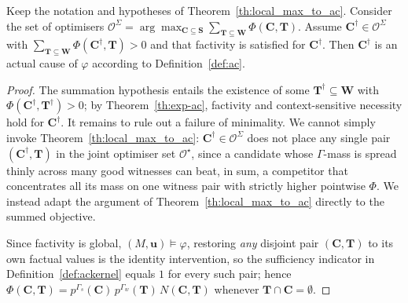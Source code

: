 \begin{corollary}\label{cor:marginalize}
Keep the notation and hypotheses of Theorem~\ref{th:local_max_to_ac}. Consider the set
of optimisers
$\mathcal{O}^\Sigma = \arg\max_{\mathbf{C}\subseteq\mathbf{S}}
\sum_{\mathbf{T}\subseteq\mathbf{W}} \Phi(\mathbf{C},\mathbf{T})$. Assume
$\mathbf{C}^\dagger\in\mathcal{O}^\Sigma$ with
$\sum_{\mathbf{T}\subseteq\mathbf{W}} \Phi(\mathbf{C}^\dagger,\mathbf{T})>0$ and that
factivity is satisfied for $\mathbf{C}^\dagger$. Then $\mathbf{C}^\dagger$ is an actual
cause of $\varphi$ according to Definition~\ref{def:ac}.
\end{corollary}

\begin{proof}
The summation hypothesis entails the existence of some
$\mathbf{T}^\dagger\subseteq\mathbf{W}$ with $\Phi(\mathbf{C}^\dagger,\mathbf{T}^\dagger)>0$;
by Theorem~\ref{th:exp-ac}, factivity and context-sensitive necessity hold for
$\mathbf{C}^\dagger$. It remains to rule out a failure of minimality. We cannot simply
invoke Theorem~\ref{th:local_max_to_ac}: $\mathbf{C}^\dagger\in\mathcal{O}^\Sigma$ does
not place any single pair $(\mathbf{C}^\dagger,\mathbf{T})$ in the joint optimiser set
$\mathcal{O}^\star$, since a candidate whose $\Gamma$-mass is spread thinly across many
good witnesses can beat, in sum, a competitor that concentrates all its mass on one
witness pair with strictly higher pointwise $\Phi$. We instead adapt the argument of
Theorem~\ref{th:local_max_to_ac} directly to the summed objective.

Since factivity is global, $(M,\mathbf{u})\models\varphi$, restoring \emph{any}
disjoint pair $(\mathbf{C},\mathbf{T})$ to its own factual values is the identity
intervention, so the sufficiency indicator in Definition~\ref{def:ackernel} equals $1$
for every such pair; hence $\Phi(\mathbf{C},\mathbf{T}) =
p^{\Gamma_s}(\mathbf{C})\,p^{\Gamma_w}(\mathbf{T})\,N(\mathbf{C},\mathbf{T})$ whenever
$\mathbf{T}\cap\mathbf{C}=\emptyset$.


\end{proof}
